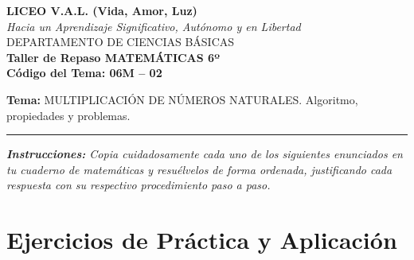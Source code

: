 \documentclass[12pt, letterpaper]{article}
\begin{document}
	\begin{center}
		{\Large \textbf{LICEO V.A.L. (Vida, Amor, Luz)}}\\[0.1cm]
		{\normalsize \textit{Hacia un Aprendizaje Significativo, Autónomo y en Libertad}}\\[0.2cm]
		{\large DEPARTAMENTO DE CIENCIAS BÁSICAS}\\[0.1cm]
		\textbf{Taller de Repaso MATEMÁTICAS 6º}\\[0.1cm]
		\textbf{Código del Tema: 06M – 02}\\[0.1cm]
	\end{center}
	
	\vspace{0.2cm}
	\noindent \textbf{Tema:} MULTIPLICACIÓN DE NÚMEROS NATURALES. Algoritmo, propiedades y problemas.
	\vspace{0.2cm}
	\hrule
	\vspace{0.4cm}
	
	\noindent \textit{\textbf{Instrucciones:} Copia cuidadosamente cada uno de los siguientes enunciados en tu cuaderno de matemáticas y resuélvelos de forma ordenada, justificando cada respuesta con su respectivo procedimiento paso a paso.}
	\vspace{0.6cm}
	
	\section*{Ejercicios de Práctica y Aplicación}
	
\end{document}
